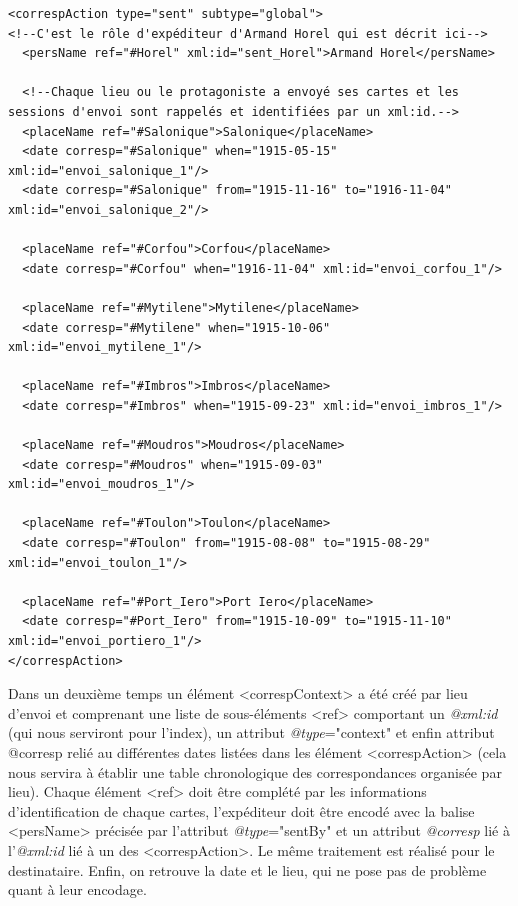 \documentclass[12pt,a4paper]{book} %
\begin{document}
\begin{lstlisting}
<correspAction type="sent" subtype="global">
<!--C'est le rôle d'expéditeur d'Armand Horel qui est décrit ici-->
  <persName ref="#Horel" xml:id="sent_Horel">Armand Horel</persName>
  
  <!--Chaque lieu ou le protagoniste a envoyé ses cartes et les sessions d'envoi sont rappelés et identifiées par un xml:id.-->
  <placeName ref="#Salonique">Salonique</placeName>
  <date corresp="#Salonique" when="1915-05-15" xml:id="envoi_salonique_1"/>
  <date corresp="#Salonique" from="1915-11-16" to="1916-11-04" xml:id="envoi_salonique_2"/>
               
  <placeName ref="#Corfou">Corfou</placeName>
  <date corresp="#Corfou" when="1916-11-04" xml:id="envoi_corfou_1"/>
               
  <placeName ref="#Mytilene">Mytilene</placeName>
  <date corresp="#Mytilene" when="1915-10-06" xml:id="envoi_mytilene_1"/>
               
  <placeName ref="#Imbros">Imbros</placeName>
  <date corresp="#Imbros" when="1915-09-23" xml:id="envoi_imbros_1"/>
               
  <placeName ref="#Moudros">Moudros</placeName>
  <date corresp="#Moudros" when="1915-09-03" xml:id="envoi_moudros_1"/>
               
  <placeName ref="#Toulon">Toulon</placeName>
  <date corresp="#Toulon" from="1915-08-08" to="1915-08-29" xml:id="envoi_toulon_1"/>
               
  <placeName ref="#Port_Iero">Port Iero</placeName>
  <date corresp="#Port_Iero" from="1915-10-09" to="1915-11-10" xml:id="envoi_portiero_1"/>
</correspAction>
\end{lstlisting}
\bigskip

Dans un deuxième temps un élément <correspContext> a été créé par lieu d'envoi et comprenant une liste de sous-éléments <ref> comportant un \textit{@xml:id} (qui nous serviront pour l'index), un attribut \textit{@type}="context" et enfin attribut @corresp relié au différentes dates listées dans les élément <correspAction> (cela nous servira à établir une table chronologique des correspondances organisée par lieu). Chaque élément <ref> doit être complété par les informations d'identification de chaque cartes, l'expéditeur doit être encodé avec la balise <persName> précisée par l'attribut \textit{@type}="sentBy" et un attribut \textit{@corresp} lié à l'\textit{@xml:id} lié à un des <correspAction>. Le même traitement est réalisé pour le destinataire. Enfin, on retrouve la date et le lieu, qui ne pose pas de problème quant à leur encodage. 
		
\end{document}

